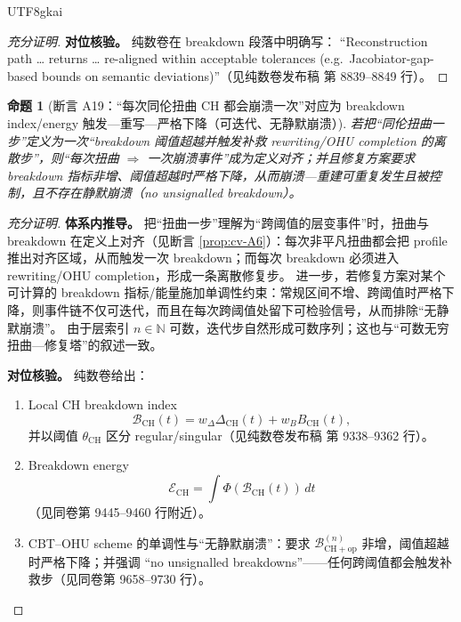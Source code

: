 \documentclass[12pt]{article}
\newtheorem{proposition}{命题}[section]
\begin{document}
\begin{CJK*}{UTF8}{gkai}
\begin{proof}[充分证明]
\textbf{对位核验。}
纯数卷在 breakdown 段落中明确写： “Reconstruction path … returns … re-aligned within acceptable tolerances (e.g.\
  Jacobiator-gap-based bounds on semantic deviations)”（见纯数卷发布稿\cite{GaoZheng2025GFramework} 第 8839--8849 行）。
\end{proof}

\begin{proposition}[断言 A19：“每次同伦扭曲 CH 都会崩溃一次”对应为 breakdown index/energy 触发—重写—严格下降（可迭代、无静默崩溃）]\label{prop:cv-A19}
若把“同伦扭曲一步”定义为一次“breakdown 阈值超越并触发补救 rewriting/OHU completion 的离散步”，则“每次扭曲 $\Rightarrow$ 一次崩溃事件”成为定义对齐；并且修复方案要求 breakdown
  指标非增、阈值超越时严格下降，从而崩溃—重建可重复发生且被控制，且不存在静默崩溃（no unsignalled breakdown）。
\end{proposition}

\begin{proof}[充分证明]
\textbf{体系内推导。}
把“扭曲一步”理解为“跨阈值的层变事件”时，扭曲与 breakdown 在定义上对齐（见断言 \ref{prop:cv-A6}）：每次非平凡扭曲都会把 profile 推出对齐区域，从而触发一次 breakdown；而每次
  breakdown 必须进入 rewriting/OHU completion，形成一条离散修复步。
进一步，若修复方案对某个可计算的 breakdown 指标/能量施加单调性约束：常规区间不增、跨阈值时严格下降，则事件链不仅可迭代，而且在每次跨阈值处留下可检验信号，从而排除“无静默崩溃”。
由于层索引 $n\in\mathbb N$ 可数，迭代步自然形成可数序列；这也与“可数无穷扭曲—修复塔”的叙述一致。

\textbf{对位核验。}
纯数卷给出：
\begin{enumerate}
  \item Local CH breakdown index
        \[
          \mathcal B_{\mathrm{CH}}(t)=w_\Delta\Delta_{\mathrm{CH}}(t)+w_B B_{\mathrm{CH}}(t),
        \]
        并以阈值 $\theta_{\mathrm{CH}}$ 区分 regular/singular（见纯数卷发布稿\cite{GaoZheng2025GFramework} 第 9338--9362 行）。
  \item Breakdown energy
        \[
          \mathcal E_{\mathrm{CH}}=\int \Phi(\mathcal B_{\mathrm{CH}}(t))\,dt
        \]
        （见同卷第 9445--9460 行附近）。
  \item CBT--OHU scheme 的单调性与“无静默崩溃”：要求 $\mathcal B_{\mathrm{CH+op}}^{(n)}$ 非增，阈值超越时严格下降；并强调 “no unsignalled
    breakdowns”——任何跨阈值都会触发补救步（见同卷第 9658--9730 行）。
\end{enumerate}
\end{proof}


\end{CJK*}
\end{document}
